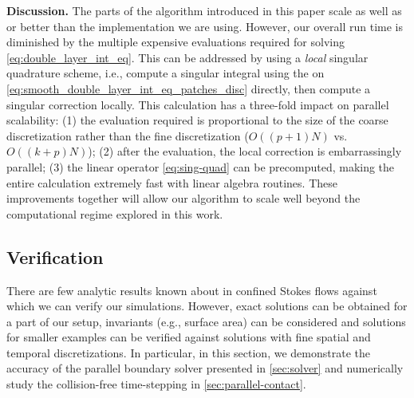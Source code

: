 \textbf{Discussion. }
The parts of the algorithm introduced in this paper scale as well as
or better than the \fmm implementation we are using.  However, our
overall run time is diminished by the multiple expensive
\fmm evaluations required for solving \cref{eq:double_layer_int_eq}.
This can be addressed by using a \textit{local} singular quadrature scheme,
i.e., compute a singular integral using the \fmm on
\cref{eq:smooth_double_layer_int_eq_patches_disc} directly, then compute a
singular correction locally.
This calculation has a three-fold impact on parallel scalability: (1) the \fmm
evaluation required is proportional to the size of the coarse discretization
rather than the fine discretization ($O((p+1)N)$ vs.\ $O((k+p)N)$);
(2) after the \fmm evaluation, the local correction is embarrassingly parallel;
(3) the linear operator \cref{eq:sing-quad} can be precomputed, making the
entire calculation extremely fast with  linear algebra routines.
These improvements together will allow our algorithm to scale well beyond the
computational regime explored in this work.

\subsection[]{Verification}
There are few analytic results known about \rbcs in confined Stokes
flows against which we can verify our simulations. However,
exact solutions can be obtained for a part of our setup, invariants
(e.g., surface area) can be considered and solutions for smaller examples can
be verified against solutions with fine spatial and temporal discretizations.
In particular, in this section, we demonstrate the accuracy of the parallel boundary
solver presented in \cref{sec:solver} and numerically study the collision-free
time-stepping in \cref{sec:parallel-contact}. 

